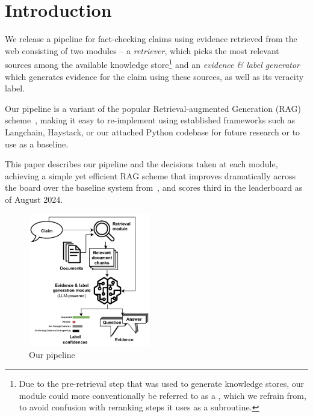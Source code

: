 
\section{Introduction}
\label{sec:introduction}
We release a pipeline for fact-checking claims using evidence retrieved from the web consisting of two modules -- a \textit{retriever}, which picks the most relevant sources among the available knowledge store\footnote{Due to the pre-retrieval step that was used to generate knowledge stores, our  module could more conventionally be referred to as a , which we refrain from, to avoid confusion with reranking steps it uses as a subroutine.} and an \textit{evidence \& label generator} which generates evidence for the claim using these sources, as well as its veracity label. 

Our pipeline is a variant of the popular Retrieval-augmented Generation (RAG) scheme~\cite{rag}, making it easy to re-implement using established frameworks such as Langchain, Haystack, or our attached Python codebase for future research or to use as a baseline.

This paper describes our pipeline and the decisions taken at each module, achieving a simple yet efficient RAG scheme that improves dramatically across the board over the baseline system from~\cite{averitec2024}, and scores third in the \averitec{}  leaderboard as of August 2024.

\begin{figure}[h]
    \centering
    \includegraphics[width=0.47\textwidth]{figures/pipeline.pdf}
    \caption{Our pipeline}
    \label{fig:pipeline}
\end{figure}

